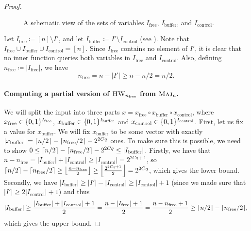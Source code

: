 \documentclass[10pt,a4paper]{article}
\theoremstyle{definition}
\theoremstyle{remark}
\newcommand{\mathsc}[1]{{\normalfont\textsc{#1}}}
\DeclarePairedDelimiter{\floor}{\lfloor}{\rfloor}
\DeclarePairedDelimiter{\ceil}{\lceil}{\rceil}
\DeclarePairedDelimiter{\set}{\{}{\}}
\DeclareMathOperator{\Maj}{\mathsc{Maj}}
\DeclareMathOperator{\HW}{\mathsc{HW}}
\newcommand{\zo}{\set{0,1}}
\newcommand{\Ifree}{I_{\mathrm{free}}}
\newcommand{\Icontrol}{I_{\mathrm{control}}}
\newcommand{\Ibuffer}{I_{\mathrm{buffer}}}
\newcommand{\xfree}{x_{\mathrm{free}}}
\newcommand{\xcontrol}{x_{\mathrm{control}}}
\newcommand{\xbuffer}{x_{\mathrm{buffer}}}
\newcommand{\nfree}{n_{\mathrm{free}}}
\begin{document}
\begin{proof}
\begin{figure}[h]

\caption{A schematic view of the sets of variables $\Ifree$, $\Ibuffer$, and $\Icontrol$.}
\label{fig:free-buffer-control}
\end{figure}

Let $\Ifree \coloneqq [n] \setminus I'$, and let $\Ibuffer \coloneqq  I' \setminus \Icontrol$ (see ).
Note that $\Ifree \cup \Ibuffer \cup \Icontrol = [n]$.
Since $\Ifree$ contains no element of $I'$, it is clear that no inner function queries both variables in $\Ifree$ and $\Icontrol$.
Also, defining $\nfree \coloneqq |\Ifree|$, we have
\begin{equation}
    \label{eq:nfree}
    \nfree = n - |I'| \geq n - n/2 = n/2.
\end{equation}

\paragraph*{Computing a partial version of $\HW_{\nfree}$ from $\Maj_n$.}
We will split the input into three parts $x = \xfree \circ \xbuffer \circ \xcontrol$, where $\xfree \in \zo^{\Ifree}$, $\xbuffer \in \zo^{\Ibuffer}$ and $\xcontrol \in \zo^{\Icontrol}$.
First, let us fix a value for $\xbuffer$.
We will fix $\xbuffer$ to be some vector with exactly $|\xbuffer| = \ceil{n/2}-\ceil{\nfree/2} - 2^{2Cq}$ ones.
To make sure this is possible, we need to show $0 \leq \ceil{n/2}-\ceil{\nfree/2} - 2^{2Cq} \leq |\Ibuffer|$.
Firstly, we have that
$n-\nfree = |\Ibuffer| + |\Icontrol| \geq |\Icontrol| = 2^{2Cq+1}$,
so $\ceil{n/2}-\ceil{\nfree/2} \geq \floor*{\frac{n - \nfree}{2}} \geq \floor*{\frac{2^{2Cq+1}}{2}} = 2^{2Cq}$, which gives the lower bound.
Secondly, we have $|\Ibuffer| \geq |I'| - |\Icontrol| \geq |\Icontrol|+1$ (since we made sure that $|I'| \geq 2|\Icontrol|+1$) and thus
\[
|\Ibuffer| \geq \frac{|\Ibuffer|+|\Icontrol|+1}{2} = \frac{n-|\Ifree|+1}{2} = \frac{n-\nfree+1}{2} \geq \ceil{n/2} - \ceil{\nfree/2},
\]
which gives the upper bound.


\end{proof}
\end{document}
